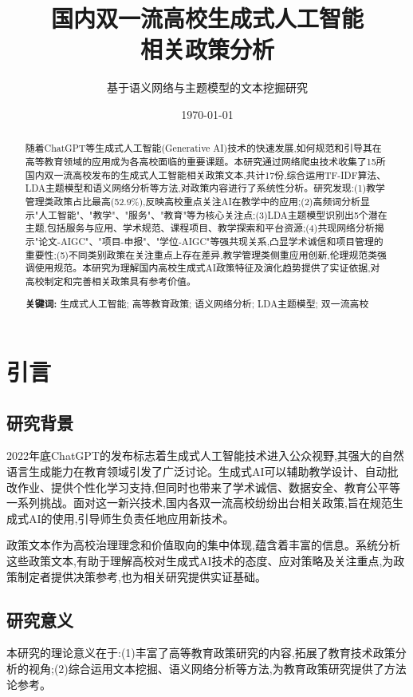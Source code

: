 \documentclass[cn,11pt,chinese]{article}
\title{\textbf{国内双一流高校生成式人工智能\\相关政策分析}}
\author{基于语义网络与主题模型的文本挖掘研究}
\date{\today}
\begin{document}
\maketitle

\begin{abstract}
随着ChatGPT等生成式人工智能(Generative AI)技术的快速发展,如何规范和引导其在高等教育领域的应用成为各高校面临的重要课题。本研究通过网络爬虫技术收集了15所国内双一流高校发布的生成式人工智能相关政策文本,共计17份,综合运用TF-IDF算法、LDA主题模型和语义网络分析等方法,对政策内容进行了系统性分析。研究发现:(1)教学管理类政策占比最高(52.9\%),反映高校重点关注AI在教学中的应用;(2)高频词分析显示"人工智能"、"教学"、"服务"、"教育"等为核心关注点;(3)LDA主题模型识别出5个潜在主题,包括服务与应用、学术规范、课程项目、教学探索和平台资源;(4)共现网络分析揭示"论文-AIGC"、"项目-申报"、"学位-AIGC"等强共现关系,凸显学术诚信和项目管理的重要性;(5)不同类别政策在关注重点上存在差异,教学管理类侧重应用创新,伦理规范类强调使用规范。本研究为理解国内高校生成式AI政策特征及演化趋势提供了实证依据,对高校制定和完善相关政策具有参考价值。

\textbf{关键词:} 生成式人工智能; 高等教育政策; 语义网络分析; LDA主题模型; 双一流高校
\end{abstract}

\section{引言}

\subsection{研究背景}

2022年底ChatGPT的发布标志着生成式人工智能技术进入公众视野,其强大的自然语言生成能力在教育领域引发了广泛讨论。生成式AI可以辅助教学设计、自动批改作业、提供个性化学习支持,但同时也带来了学术诚信、数据安全、教育公平等一系列挑战\cite{ref1}。面对这一新兴技术,国内各双一流高校纷纷出台相关政策,旨在规范生成式AI的使用,引导师生负责任地应用新技术。

政策文本作为高校治理理念和价值取向的集中体现,蕴含着丰富的信息。系统分析这些政策文本,有助于理解高校对生成式AI技术的态度、应对策略及关注重点,为政策制定者提供决策参考,也为相关研究提供实证基础。

\subsection{研究意义}

本研究的理论意义在于:(1)丰富了高等教育政策研究的内容,拓展了教育技术政策分析的视角;(2)综合运用文本挖掘、语义网络分析等方法,为教育政策研究提供了方法论参考。
\end{document}
